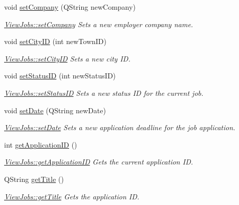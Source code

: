 \begin{DoxyCompactItemize}
void \hyperlink{class_view_jobs_a596246d07be66a5aeaf14ff8e5649290}{set\+Company} (Q\+String new\+Company)
\begin{DoxyCompactList}\small\item\em \hyperlink{class_view_jobs_a596246d07be66a5aeaf14ff8e5649290}{View\+Jobs\+::set\+Company} Sets a new employer company name. \end{DoxyCompactList}\item 
void \hyperlink{class_view_jobs_ad89218b37af85cac9ce6c346efb57e56}{set\+City\+ID} (int new\+Town\+ID)
\begin{DoxyCompactList}\small\item\em \hyperlink{class_view_jobs_ad89218b37af85cac9ce6c346efb57e56}{View\+Jobs\+::set\+City\+ID} Sets a new city ID. \end{DoxyCompactList}\item 
void \hyperlink{class_view_jobs_a55943415fd91377d5f701f7074ba58d6}{set\+Status\+ID} (int new\+Status\+ID)
\begin{DoxyCompactList}\small\item\em \hyperlink{class_view_jobs_a55943415fd91377d5f701f7074ba58d6}{View\+Jobs\+::set\+Status\+ID} Sets a new status ID for the current job. \end{DoxyCompactList}\item 
void \hyperlink{class_view_jobs_a7574794410eb40956f343976de97221f}{set\+Date} (Q\+String new\+Date)
\begin{DoxyCompactList}\small\item\em \hyperlink{class_view_jobs_a7574794410eb40956f343976de97221f}{View\+Jobs\+::set\+Date} Sets a new application deadline for the job application. \end{DoxyCompactList}\item 
int \hyperlink{class_view_jobs_a086650882ad80acb4074cf697f8cddcb}{get\+Application\+ID} ()
\begin{DoxyCompactList}\small\item\em \hyperlink{class_view_jobs_a086650882ad80acb4074cf697f8cddcb}{View\+Jobs\+::get\+Application\+ID} Gets the current application ID. \end{DoxyCompactList}\item 
Q\+String \hyperlink{class_view_jobs_ae78f119d37c77a9e3e457ecfd78d7de3}{get\+Title} ()
\begin{DoxyCompactList}\small\item\em \hyperlink{class_view_jobs_ae78f119d37c77a9e3e457ecfd78d7de3}{View\+Jobs\+::get\+Title} Gets the application ID. \end{DoxyCompactList}\item 

\end{DoxyCompactItemize}
